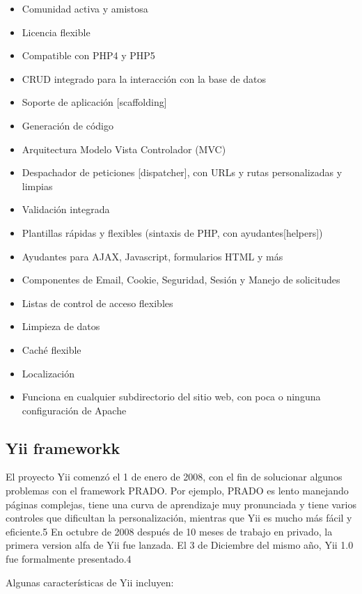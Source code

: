 \begin{itemize}

\item Comunidad activa y amistosa
\item Licencia flexible
\item Compatible con PHP4 y PHP5
\item CRUD integrado para la interacción con la base de datos
\item Soporte de aplicación [scaffolding]
\item Generación de código
\item Arquitectura Modelo Vista Controlador (MVC)
\item Despachador de peticiones [dispatcher], con URLs y rutas personalizadas y limpias
\item Validación integrada
\item Plantillas rápidas y flexibles (sintaxis de PHP, con ayudantes[helpers])
\item Ayudantes para AJAX, Javascript, formularios HTML y más
\item Componentes de Email, Cookie, Seguridad, Sesión y Manejo de solicitudes
\item Listas de control de acceso flexibles
\item Limpieza de datos
\item Caché flexible
\item Localización
\item Funciona en cualquier subdirectorio del sitio web, con poca o ninguna configuración de Apache

\end{itemize}

\subsection{Yii frameworkk}

El proyecto Yii comenzó el 1 de enero de 2008, con el fin de solucionar algunos problemas con el framework PRADO. Por ejemplo, PRADO es lento manejando páginas complejas, tiene una curva de aprendizaje muy pronunciada y tiene varios controles que dificultan la personalización, mientras que Yii es mucho más fácil y eficiente.5 En octubre de 2008 después de 10 meses de trabajo en privado, la primera version alfa de Yii fue lanzada. El 3 de Diciembre del mismo año, Yii 1.0 fue formalmente presentado.4

Algunas características de Yii incluyen:

